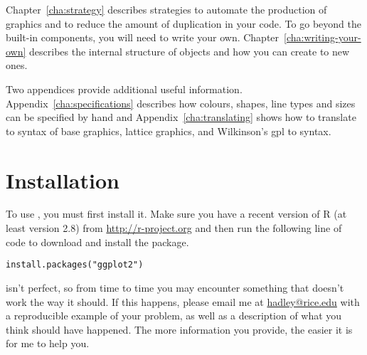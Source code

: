 Chapter~\ref{cha:strategy} describes strategies to automate the production of \ggplot graphics and to reduce the amount of duplication in your code.  To go beyond the built-in components, you will need to write your own. Chapter~\ref{cha:writing-your-own} describes the internal structure of \ggplot objects and how you can create to new ones.

Two appendices provide additional useful information.  Appendix~\ref{cha:specifications} describes how colours, shapes, line types and sizes can be specified by hand and Appendix~\ref{cha:translating} shows how to translate to syntax of base graphics, lattice graphics, and Wilkinson's {\sc gpl} to \ggplot syntax.

\section{Installation}\label{sub:installation}

To use \ggplot, you must first install it. Make sure you have a recent version of R (at least version 2.8) from \url{http://r-project.org} and then run the following line of code to download and install the \ggplot package.  

\begin{verbatim}
install.packages("ggplot2")
\end{verbatim}

% 
% 
% 

\ggplot isn't perfect, so from time to time you may encounter something that doesn't work the way it should.  If this happens, please email me at \href{mailto:hadley@rice.edu}{hadley@rice.edu} with a reproducible example of your problem, as well as a description of what you think should have happened.  The more information you provide, the easier it is for me to help you.

